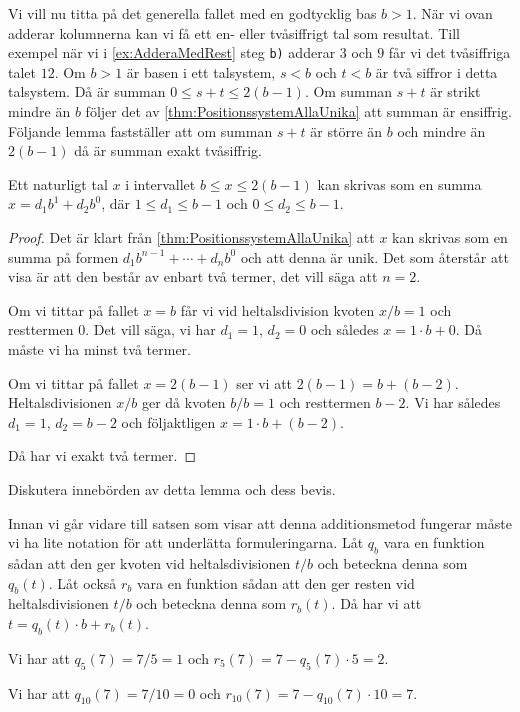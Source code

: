Vi vill nu titta på det generella fallet med en godtycklig bas \(b>1\).
När vi ovan adderar kolumnerna kan vi få ett en- eller tvåsiffrigt tal som
resultat.
Till exempel när vi i \cref{ex:AdderaMedRest} steg \verb'b)' adderar \(3\)
och \(9\) får vi det tvåsiffriga talet \(12\).
Om \(b>1\) är basen i ett talsystem, \(s<b\) och \(t<b\) är två siffror i detta
talsystem.
Då är summan \(0\leq s+t\leq 2(b-1)\).
Om summan \(s+t\) är strikt mindre än \(b\) följer det av
\cref{thm:PositionssystemAllaUnika} att summan är ensiffrig.
Följande lemma fastställer att om summan \(s+t\) är större än \(b\) och mindre
än \(2(b-1)\) då är summan exakt tvåsiffrig.
\begin{lemma}\label{lem:AdditionSiffror}
  Ett naturligt tal \(x\) i intervallet \(b \leq x \leq 2(b-1)\) kan skrivas
  som en summa \(x = d_1b^1 + d_2b^0\),
  där \(1 \leq d_1 \leq b-1\) och \(0 \leq d_2 \leq b-1\).
\end{lemma}
\begin{proof}
  Det är klart från \cref{thm:PositionssystemAllaUnika} att \(x\) kan
  skrivas som en summa på formen \(d_1 b^{n-1} + \cdots + d_n b^0\) och att 
  denna är unik.
  Det som återstår att visa är att den består av enbart två termer, det vill
  säga att \(n=2\).

  Om vi tittar på fallet \(x=b\) får vi vid heltalsdivision kvoten \(x/b = 1\)
  och resttermen \(0\).
  Det vill säga, vi har \(d_1=1\), \(d_2=0\) och således \(x=1\cdot b+0\).
  Då måste vi ha minst två termer.

  Om vi tittar på fallet \(x=2(b-1)\) ser vi att \(2(b-1)=b+(b-2)\).
  Heltalsdivisionen \(x/b\) ger då kvoten \(b/b=1\) och resttermen \(b-2\).
  Vi har således \(d_1=1\), \(d_2=b-2\) och följaktligen
  \(x=1\cdot b+(b-2)\).

  Då har vi exakt två termer.
\end{proof}

\begin{exercise}
  Diskutera innebörden av detta lemma och dess bevis.
\end{exercise}

Innan vi går vidare till satsen som visar att denna additionsmetod fungerar
måste vi ha lite notation för att underlätta formuleringarna.
Låt \(q_b\) vara en funktion sådan att den ger kvoten vid heltalsdivisionen
\(t/b\) och beteckna denna som \(q_b(t)\).
Låt också \(r_b\) vara en funktion sådan att den ger resten vid
heltalsdivisionen \(t/b\) och beteckna denna som \(r_b(t)\).
Då har vi att \(t=q_b(t)\cdot b+r_b(t)\).
\begin{example}
  Vi har att \(q_5(7)=7/5=1\) och \(r_5(7)=7-q_5(7)\cdot 5=2\).
\end{example}
\begin{example}
  Vi har att \(q_{10}(7)=7/10=0\) och \(r_{10}(7)=7-q_{10}(7)\cdot 10=7\).
\end{example}

